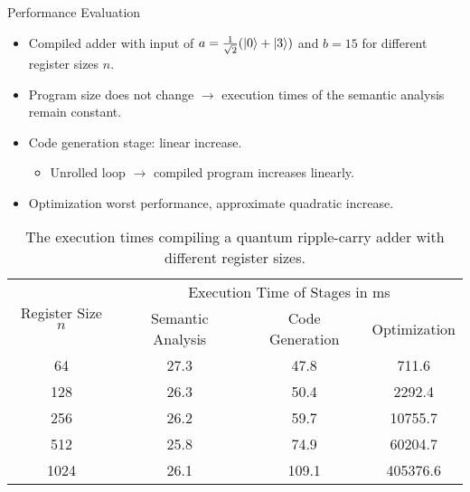 \begin{frame}{Performance Evaluation}
    \begin{itemize}
        \item Compiled adder with input of $a = \frac{1}{\sqrt{2}} (\ket{0} + \ket{3})$ and $b = 15$ for different register sizes $n$.
        \item Program size does not change $\to$ execution times of the semantic analysis remain constant.
        \item Code generation stage: linear increase.
        \begin{itemize}
            \item Unrolled loop $\to$ compiled program increases linearly.
        \end{itemize}
        \item Optimization worst performance, approximate quadratic increase.
    \end{itemize}
    \begin{table}[htp]
        \centering     
        \begin{tabular}{c|ccc}
        \multirow{2}{*}{Register Size $n$} & \multicolumn{3}{c}{Execution Time of Stages in ms}                                                  \\ \cline{2-4} 
                                           & \multicolumn{1}{c|}{Semantic Analysis} & \multicolumn{1}{c|}{Code Generation} & Optimization \\ \hline
        64                                 & \multicolumn{1}{c|}{27.3}                & \multicolumn{1}{c|}{47.8}              & 711.6          \\
        128                                & \multicolumn{1}{c|}{26.3}                & \multicolumn{1}{c|}{50.4}              & 2292.4         \\
        256                                & \multicolumn{1}{c|}{26.2}                & \multicolumn{1}{c|}{59.7}              & 10755.7        \\
        512                                & \multicolumn{1}{c|}{25.8}                & \multicolumn{1}{c|}{74.9}              & 60204.7        \\
        1024                               & \multicolumn{1}{c|}{26.1}                & \multicolumn{1}{c|}{109.1}             & 405376.6      
    \end{tabular}
    \caption{The execution times compiling a quantum ripple-carry adder with different register sizes.}
    \end{table}
    
\end{frame}